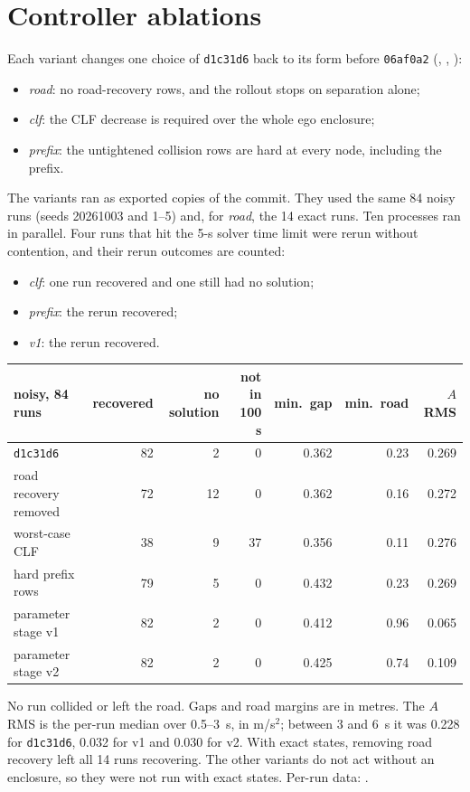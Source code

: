 \documentclass[11pt]{article}
\begin{document}
\section{Controller ablations}
Each variant changes one choice of \texttt{d1c31d6} back to its form before
\texttt{06af0a2} (, ,
):
\begin{itemize}
\item \emph{road}: no road-recovery rows, and the rollout stops on separation
  alone;
\item \emph{clf}: the CLF decrease is required over the whole ego enclosure;
\item \emph{prefix}: the untightened collision rows are hard at every node,
  including the prefix.
\end{itemize}
The variants ran as exported copies of the commit. They used the same 84 noisy
runs (seeds 20261003 and 1--5) and, for \emph{road}, the 14 exact runs. Ten
processes ran in parallel. Four runs that hit the 5-s solver time limit were
rerun without contention, and their rerun outcomes are counted:
\begin{itemize}
\item \emph{clf}: one run recovered and one still had no solution;
\item \emph{prefix}: the rerun recovered;
\item \emph{v1}: the rerun recovered.
\end{itemize}
\begin{center}
\begin{tabular}{lrrrrrr}
\toprule
noisy, 84 runs & recovered & no solution & not in 100 s & min.\ gap & min.\ road & $A$ RMS\\
\midrule
\texttt{d1c31d6} & 82 & 2 & 0 & 0.362 & 0.23 & 0.269\\
road recovery removed & 72 & 12 & 0 & 0.362 & 0.16 & 0.272\\
worst-case CLF & 38 & 9 & 37 & 0.356 & 0.11 & 0.276\\
hard prefix rows & 79 & 5 & 0 & 0.432 & 0.23 & 0.269\\
parameter stage v1 & 82 & 2 & 0 & 0.412 & 0.96 & 0.065\\
parameter stage v2 & 82 & 2 & 0 & 0.425 & 0.74 & 0.109\\
\bottomrule
\end{tabular}
\end{center}
No run collided or left the road. Gaps and road margins are in metres. The
$A$ RMS is the per-run median over 0.5--3~s, in m/s$^2$; between 3 and 6~s it
was 0.228 for \texttt{d1c31d6}, 0.032 for v1 and 0.030 for v2. With exact
states, removing road recovery left all 14 runs recovering. The other variants
do not act without an enclosure, so they were not run with exact states.
Per-run data: .
\end{document}
